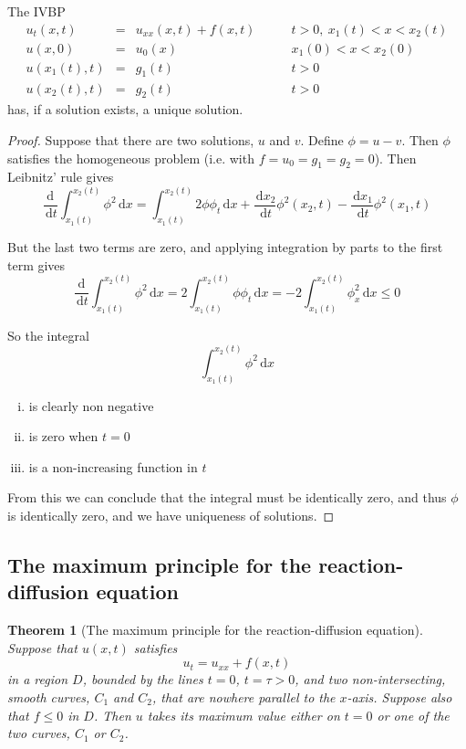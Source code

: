 \documentclass[10pt,fleqn]{article}
\newcommand{\diff}{\,\mathrm{d}}
\theoremstyle{definition} \newtheorem{defn}{Definition}[section]
\theoremstyle{plain}      \newtheorem{thm}[defn]{Theorem}
\theoremstyle{plain}      \newtheorem{lem}[defn]{Lemma}
\theoremstyle{definition} \newtheorem{prop}[defn]{Proposition}
\theoremstyle{definition} \newtheorem{cor}[defn]{Corollary}
\theoremstyle{definition} \newtheorem{ex}[defn]{Example}
\theoremstyle{definition} \newtheorem{rem}[defn]{Remark}
\begin{document}
{The IVBP
\begin{equation}
    \begin{array}{rcll}
        u_t(x,t)&=&u_{xx}(x,t)+f(x,t)\qquad &t>0,~x_1(t)<x<x_2(t)\\
        u(x,0)&=&u_0(x)&x_1(0)<x<x_2(0)\\
        u(x_1(t),t)&=&g_1(t)&t>0\\
        u(x_2(t),t)&=&g_2(t)&t>0
    \end{array}
\end{equation}
has, if a solution exists, a unique solution.

\begin{proof}
    Suppose that there are two solutions, $u$ and $v$.
    Define $\phi=u-v$.
    Then $\phi$ satisfies the homogeneous problem (i.e. with $f=u_0=g_1=g_2=0$).
    Then Leibnitz' rule gives
    \[
        \frac{\mathrm{d}}{\diff t}\int_{x_1(t)}^{x_2(t)}\phi^2\diff x=
        \int_{x_1(t)}^{x_2(t)}2\phi\phi_t\diff x +\frac{\diff x_2}{\diff t}\phi^2(x_2,t)-\frac{\diff x_1}{\diff t}\phi^2(x_1,t)
    \]

    But the last two terms are zero, and applying integration by parts to the first term gives
    \[
        \frac{\mathrm{d}}{\diff t}\int_{x_1(t)}^{x_2(t)}\phi^2\diff x=
        2\int_{x_1(t)}^{x_2(t)}\phi\phi_t\diff x=
        -2\int_{x_1(t)}^{x_2(t)}\phi_x^2\diff x\leq0
    \]

    So the integral
    \[
        \int_{x_1(t)}^{x_2(t)}\phi^2\diff x
    \]
    \begin{enumerate}[(i)]
        \item is clearly non negative
        \item is zero when $t=0$
        \item is a non-increasing function in $t$
    \end{enumerate}

    From this we can conclude that the integral must be identically zero, and thus $\phi$ is identically zero, and we have uniqueness of solutions.
\end{proof}


\subsection{The maximum principle for the reaction-diffusion equation}

\begin{thm}[The maximum principle for the reaction-diffusion equation]
    Suppose that $u(x,t)$ satisfies
    \[
        u_t=u_{xx}+f(x,t)
    \]
    in a region $D$, bounded by the lines $t=0$, $t=\tau>0$, and two non-intersecting, smooth curves, $C_1$ and $C_2$, that are nowhere parallel to the $x$-axis.
    Suppose also that $f\leq0$ in $D$.
    Then $u$ takes its maximum value either on $t=0$ or one of the two curves, $C_1$ or $C_2$.
\end{thm}

}
\end{document}
